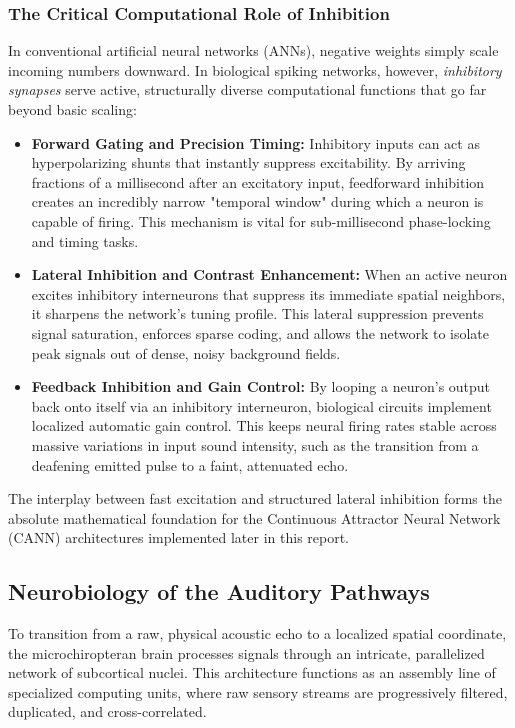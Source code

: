 \subsubsection{The Critical Computational Role of Inhibition}
In conventional artificial neural networks (ANNs), negative weights simply scale incoming numbers downward. In biological spiking networks, however, \textit{inhibitory synapses} serve active, structurally diverse computational functions that go far beyond basic scaling:
\begin{itemize}
    \item \textbf{Forward Gating and Precision Timing:} Inhibitory inputs can act as hyperpolarizing shunts that instantly suppress excitability. By arriving fractions of a millisecond after an excitatory input, feedforward inhibition creates an incredibly narrow "temporal window" during which a neuron is capable of firing. This mechanism is vital for sub-millisecond phase-locking and timing tasks.
    \item \textbf{Lateral Inhibition and Contrast Enhancement:} When an active neuron excites inhibitory interneurons that suppress its immediate spatial neighbors, it sharpens the network's tuning profile. This lateral suppression prevents signal saturation, enforces sparse coding, and allows the network to isolate peak signals out of dense, noisy background fields.
    \item \textbf{Feedback Inhibition and Gain Control:} By looping a neuron's output back onto itself via an inhibitory interneuron, biological circuits implement localized automatic gain control. This keeps neural firing rates stable across massive variations in input sound intensity, such as the transition from a deafening emitted pulse to a faint, attenuated echo.
\end{itemize}
The interplay between fast excitation and structured lateral inhibition forms the absolute mathematical foundation for the Continuous Attractor Neural Network (CANN) architectures implemented later in this report.


\subsection{Neurobiology of the Auditory Pathways}
To transition from a raw, physical acoustic echo to a localized spatial coordinate, the microchiropteran brain processes signals through an intricate, parallelized network of subcortical nuclei. This architecture functions as an assembly line of specialized computing units, where raw sensory streams are progressively filtered, duplicated, and cross-correlated. 

